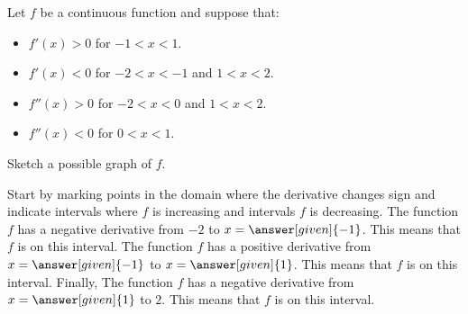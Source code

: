 \documentclass{ximera}
\begin{document}
\begin{example}
  Let $f$ be a continuous function and suppose that:
  \begin{itemize}
  \item $f'(x) > 0$ for $-1< x<1$.
  \item $f'(x) < 0$ for $-2< x<-1$ and $1<x<2$.
  \item $f''(x) > 0$ for $-2<x<0$ and $1<x< 2$.
  \item $f''(x) < 0$ for $0<x< 1$.  
  \end{itemize}
  Sketch a possible graph of $f$.
  \begin{explanation}
    Start by marking points in the domain where the derivative changes sign and indicate
    intervals where $f$ is increasing and intervals $f$ is
    decreasing. The function $f$ has a negative derivative from $-2$
    to $x=\answer[given]{-1}$. This means that $f$ is
     on
    this interval. The function $f$ has a positive derivative from
    $x=\answer[given]{-1}$ to $x=\answer[given]{1}$. This means that
    $f$ is
     on
    this interval. Finally, The function $f$ has a negative derivative
    from $x=\answer[given]{1}$ to $2$. This means that $f$ is
     on
    this interval.
  \begin{image}
\end{image}
\end{explanation}
\end{example}
\end{document}
